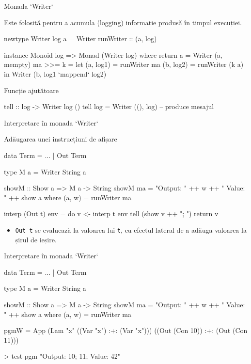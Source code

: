 \documentclass[xcolor=pdftex,romanian,colorlinks]{beamer}
\newcommand{\li}[1]{\lstinline$#1$}
\begin{document}
\begin{frame}[fragile]{Monada `Writer`}


Este folosită pentru a acumula
(logging) informație produsă în timpul execuției.

\begin{asciihs}
newtype Writer log a = Writer { runWriter :: (a, log) }

instance Monoid log => Monad (Writer log) where
  return a = Writer (a, mempty)
  ma >>= k = let (a, log1) = runWriter ma
                 (b, log2) = runWriter (k a)
              in Writer (b, log1 `mappend` log2)
\end{asciihs}              

Funcție ajutătoare

\begin{asciihs}
tell :: log -> Writer log () 
tell log = Writer ((), log)  -- produce mesajul
\end{asciihs}
\end{frame}

\begin{frame}[fragile]{Interpretare în monada `Writer`}



Adăugarea unei instrucțiuni de afișare

data Term = ... | Out Term

\begin{asciihs}
type M a = Writer String a

showM :: Show a => M a -> String
showM ma = "Output: " ++ w ++ "  Value: " ++ show a
  where (a, w) = runWriter ma


interp (Out t) env = do
  v <- interp t env
  tell (show v ++ "; ")
  return v
  
\end{asciihs}
\begin{itemize}
\item \li{Out t} se evaluează la valoarea lui \li{t},
    cu efectul lateral de a adăuga valoarea la șirul de ieșire.  
    \end{itemize}
\end{frame}    
    
  
\begin{frame}[fragile]{Interpretare în monada `Writer`}



\begin{asciihs}

data Term = ... | Out Term

type M a = Writer String a

showM :: Show a => M a -> String
showM ma = "Output: " ++ w ++ "  Value: " ++ show a
  where (a, w) = runWriter ma
\end{asciihs}


\begin{asciihs}
pgmW = App 
          (Lam "x" ((Var "x") :+: (Var "x")))
          ((Out (Con 10)) :+: (Out (Con 11)))
          
> test pgm
"Output: 10; 11; Value: 42"
\end{asciihs}
\end{frame}
\end{document}
